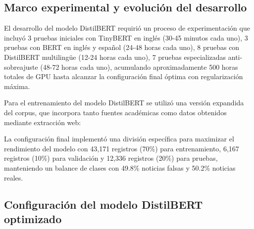 \subsection{Marco experimental y evolución del desarrollo}
\label{subsec:marco_experimental_distilbert}

El desarrollo del modelo DistilBERT requirió un proceso de experimentación que incluyó 3 pruebas iniciales con TinyBERT en inglés (30-45 minutos cada uno), 3 pruebas con BERT en inglés y español (24-48 horas cada uno), 8 pruebas con DistilBERT multilingüe (12-24 horas cada uno), 7 pruebas especializadas anti-sobreajuste (48-72 horas cada uno), acumulando aproximadamente 500 horas totales de GPU hasta alcanzar la configuración final óptima con regularización máxima.

Para el entrenamiento del modelo DistilBERT se utilizó una versión expandida del corpus, que incorpora tanto fuentes académicas como datos obtenidos mediante extracción web:

\begin{table}[htbp]
\centering
{}
\caption{Composición del corpus expandido utilizado para el entrenamiento de DistilBERT.}
\label{tab:corpus_expandido_distilbert}
\end{table}

La configuración final implementó una división específica para maximizar el rendimiento del modelo con 43,171 registros (70\%) para entrenamiento, 6,167 registros (10\%) para validación y 12,336 registros (20\%) para pruebas, manteniendo un balance de clases con 49.8\% noticias falsas y 50.2\% noticias reales.

\subsection{Configuración del modelo DistilBERT optimizado}
\label{subsec:configuracion_distilbert}

